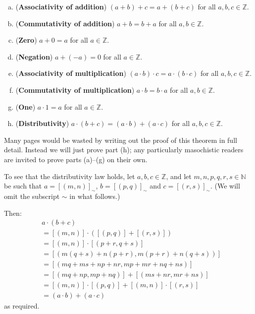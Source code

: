 \begin{theorem}
\fixlistskip%
\begin{enumerate}[(a)]
\item (\textbf{Associativity of addition}) $(a+b)+c = a+(b+c)$ for all $a,b,c \in \mathbb{Z}$.
\item (\textbf{Commutativity of addition}) $a+b=b+a$ for all $a,b \in \mathbb{Z}$.
\item (\textbf{Zero}) $a+0 = a$ for all $a \in \mathbb{Z}$.
\item (\textbf{Negation}) $a + (-a) = 0$ for all $a \in \mathbb{Z}$.
\item (\textbf{Associativity of multiplication}) $(a \cdot b) \cdot c = a \cdot (b \cdot c)$ for all $a,b,c \in \mathbb{Z}$.
\item (\textbf{Commutativity of multiplication}) $a \cdot b = b \cdot a$ for all $a,b \in \mathbb{Z}$.
\item (\textbf{One}) $a \cdot 1 = a$ for all $a \in \mathbb{Z}$.
\item (\textbf{Distributivity}) $a \cdot (b + c) = (a \cdot b) + (a \cdot c)$ for all $a,b,c \in \mathbb{Z}$.
\end{enumerate}
\end{theorem}

\begin{cproof}
Many pages would be wasted by writing out the proof of this theorem in full detail. Instead we will just prove part (h); any particularly masochistic readers are invited to prove parts (a)--(g) on their own.

To see that the distributivity law holds, let $a,b,c \in \mathbb{Z}$, and let $m,n,p,q,r,s \in \mathbb{N}$ be such that $a = [(m,n)]_{\sim}$, $b = [(p,q)]_{\sim}$ and $c = [(r,s)]_{\sim}$. (We will omit the subscript $\sim$ in what follows.)

Then:
\begin{align*}
& a \cdot (b + c) \\
&= [(m,n)] \cdot ([(p,q)] + [(r,s)]) \\
&= [(m,n)] \cdot [(p+r,q+s)] \\
&= [(m(q+s)+n(p+r), m(p+r) + n(q+s))] \\
&= [(mq+ms+np+nr, mp+mr+nq+ns)] \\
&= [(mq+np, mp+nq)] + [(ms+nr, mr+ns)] \\
&= [(m,n)] \cdot [(p,q)] + [(m,n)] \cdot [(r,s)] \\
&= (a \cdot b) + (a \cdot c)
\end{align*}
as required.
\end{cproof}

